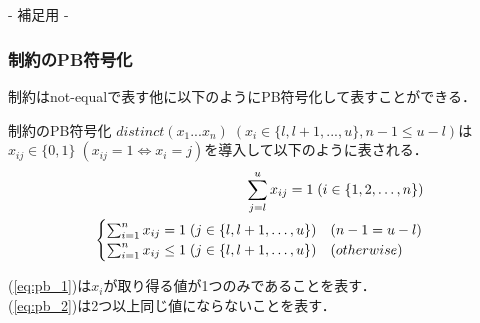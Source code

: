 

\appendix

\backupbegin



\begin{frame}
    \frametitle{~}
    \centering
    - 補足用 -
\end{frame}


\begin{frame}
    \frametitle{\distinct 制約のPB符号化}
    \distinct 制約はnot-equalで表す他に以下のようにPB符号化して表すことができる．
    \begin{block}{ \distinct 制約のPB符号化}
        $distinct(x_1 ... x_n) \; (x_i \in \{l, l+1, ..., u\}, n-1 \leq u-l)$は
        $x_{ij} \in \{0,1\} \; (x_{ij}=1 \Leftrightarrow x_i=j)$を導入して以下のように表される．
        \begin{eqnarray}
            \sum_{j=l}^{u} x_{ij}=1 \; (i \in \{1,2,\ldots,n\}) \label{eq:pb_1}\\
            \vspace{-3mm}
            \begin{cases}
                \sum_{i=1}^{n} x_{ij} = 1 \; (j \in \{l,l+1,\ldots,u\}) & (n-1=u-l) \\
                \sum_{i=1}^{n} x_{ij} \leq 1 \; (j \in \{l,l+1,\ldots,u\}) & (otherwise)
            \end{cases}\label{eq:pb_2}
        \end{eqnarray}
    \end{block}
    (\ref{eq:pb_1})は$x_i$が取り得る値が1つのみであることを表す．\\
    (\ref{eq:pb_2})は2つ以上同じ値にならないことを表す．
\end{frame}

